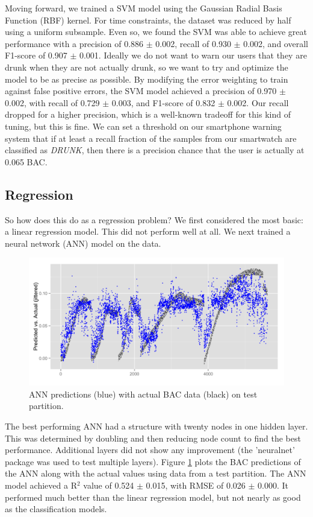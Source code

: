 Moving forward, we trained a SVM model using the Gaussian Radial Basis Function (RBF) kernel. For time constraints, the dataset was reduced by half using a uniform subsample. Even so, we found the SVM was able to achieve great performance with a precision of 0.886 $\pm$ 0.002, recall of 0.930 $\pm$ 0.002, and overall F1-score of 0.907 $\pm$ 0.001. Ideally we do not want to warn our users that they are drunk when they are not actually drunk, so we want to try and optimize the model to be as precise as possible. By modifying the error weighting to train against false positive errors, the SVM model achieved a precision of 0.970 $\pm$ 0.002, with recall of 0.729 $\pm$ 0.003, and F1-score of 0.832 $\pm$ 0.002. Our recall dropped for a higher precision, which is a well-known tradeoff for this kind of tuning, but this is fine. We can set a threshold on our smartphone warning system that if at least a recall fraction of the samples from our smartwatch are classified as \textit{DRUNK}, then there is a precision chance that the user is actually at 0.065 BAC.

\subsection{Regression}

So how does this do as a regression problem? We first considered the most basic: a linear regression model. This did not perform well at all. We next trained a neural network (ANN) model on the data. \begin{figure}
	\includegraphics[width=1.0\textwidth]{../figs/nn_all}
	\caption{ANN predictions (blue) with actual BAC data (black) on test partition.}
	\label{fig:nn_all}
\end{figure}The best performing ANN had a structure with twenty nodes in one hidden layer. This was determined by doubling and then reducing node count to find the best performance. Additional layers did not show any improvement (the 'neuralnet' package was used to test multiple layers). Figure \ref{fig:nn_all} plots the BAC predictions of the ANN along with the actual values using data from a test partition. The ANN model achieved a R$^2$ value of 0.524 $\pm$ 0.015, with RMSE of 0.026 $\pm$ 0.000. It performed much better than the linear regression model, but not nearly as good as the classification models.